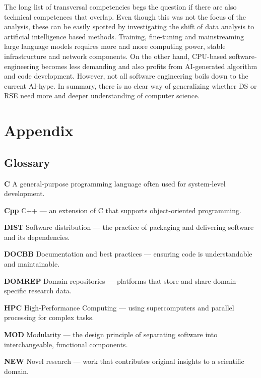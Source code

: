 \documentclass[
        english,biblatex
    ]{lni}
\begin{document}
    The long list of transversal competencies begs the question if there
    are also technical competences that overlap. Even though this was
    not the focus of the analysis, these can be easily spotted by
    investigating the shift of data analysis to artificial intelligence
    based methods. Training, fine-tuning and mainstreaming large
    language models requires more and more computing power, stable
    infrastructure and network components. On the other hand, CPU-based
    software-engineering becomes less demanding and also profits from
    AI-generated algorithm and code development. However, not all
    software engineering boils down to the current AI-hype. In summary,
    there is no clear way of generalizing whether DS or RSE need more
    and deeper understanding of computer science.

    \printbibliography

    \section{Appendix}\label{sec:appendix}

    \subsection{Glossary}\label{glossary}

    \textbf{C} A general-purpose programming language often used for
    system-level development.

    \textbf{Cpp} C++ --- an extension of C that supports object-oriented
    programming.

    \textbf{DIST} Software distribution --- the practice of packaging
    and delivering software and its dependencies.

    \textbf{DOCBB} Documentation and best practices --- ensuring code is
    understandable and maintainable.

    \textbf{DOMREP} Domain repositories --- platforms that store and
    share domain-specific research data.

    \textbf{HPC} High-Performance Computing --- using supercomputers and
    parallel processing for complex tasks.

    \textbf{MOD} Modularity --- the design principle of separating
    software into interchangeable, functional components.

    \textbf{NEW} Novel research --- work that contributes original
    insights to a scientific domain.
\end{document}
